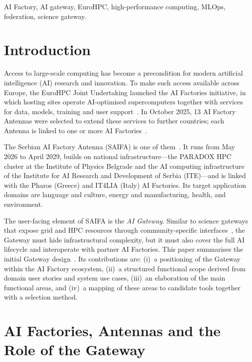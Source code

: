 \documentclass[conference,a4paper]{IEEEtran}
\begin{document}
\begin{IEEEkeywords}
AI Factory, AI gateway, EuroHPC, high-performance computing, MLOps, federation, science gateway.
\end{IEEEkeywords}

\section{Introduction}

Access to large-scale computing has become a precondition for modern artificial intelligence (AI) research and innovation. To make such access available across Europe, the EuroHPC Joint Undertaking launched the AI Factories initiative, in which hosting sites operate AI-optimised supercomputers together with services for data, models, training and user support~\cite{eurohpc_aif}. In October 2025, 13 AI Factory Antennas were selected to extend these services to further countries; each Antenna is linked to one or more AI Factories~\cite{eurohpc_antennas}.

The Serbian AI Factory Antenna (SAIFA) is one of them~\cite{cordis_saifa}. It runs from May 2026 to April 2029, builds on national infrastructure---the PARADOX HPC cluster at the Institute of Physics Belgrade and the AI computing infrastructure of the Institute for AI Research and Development of Serbia (ITE)---and is linked with the Pharos (Greece) and IT4LIA (Italy) AI Factories. Its target application domains are language and culture, energy and manufacturing, health, and environment.

The user-facing element of SAIFA is the \emph{AI Gateway}. Similar to science gateways that expose grid and HPC resources through community-specific interfaces~\cite{wilkinsdiehr2007}, the Gateway must hide infrastructural complexity, but it must also cover the full AI lifecycle and interoperate with partner AI Factories. This paper summarises the initial Gateway design~\cite{saifa_d31}. Its contributions are: (i)~a positioning of the Gateway within the AI Factory ecosystem, (ii)~a structured functional scope derived from domain user stories and system use cases, (iii)~an elaboration of the main functional areas, and (iv)~a mapping of these areas to candidate tools together with a selection method.

\section{AI Factories, Antennas and the Role of the Gateway}
\end{document}
